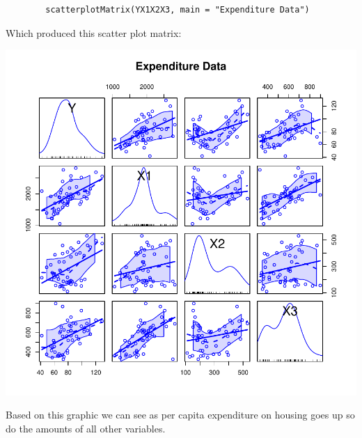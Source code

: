 \documentclass[12pt,letterpaper]{article}
\begin{document}
     \begin{Verbatim}
     	scatterplotMatrix(YX1X2X3, main = "Expenditure Data")
     \end{Verbatim}
     Which produced this scatter plot matrix:
\begin{center}
\includegraphics{Scatter_plot_Matrix_withtitle}\\
\end{center}
Based on this graphic we can see as per capita expenditure on housing goes up so do the amounts of all other variables.   
\end{document}
